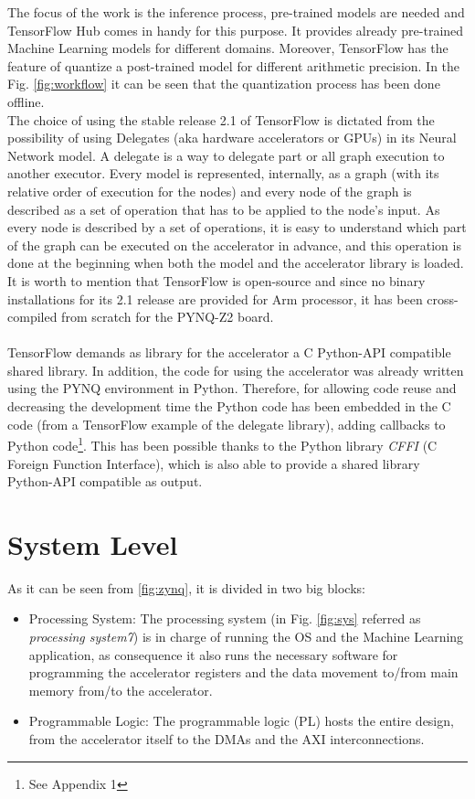 The focus of the work is the inference process, pre-trained models are needed and TensorFlow Hub \cite{WEBSITE:5} comes in handy for this purpose. It provides already pre-trained Machine Learning models for different domains. Moreover, TensorFlow has the feature of quantize a post-trained model for different arithmetic precision. In the Fig. \ref{fig:workflow} it can be seen that the quantization process has been done offline.\\
The choice of using the stable release 2.1 of TensorFlow is dictated from the possibility of using Delegates (aka hardware accelerators or GPUs) in its Neural Network model. A delegate is a way to delegate part or all graph execution to another executor. Every model is represented, internally, as a graph (with its relative order of execution for the nodes) and every node of the graph is described as a set of operation that has to be applied to the node's input. As every node is described by a set of operations, it is easy to understand which part of the graph can be executed on the accelerator in advance, and this operation is done at the beginning when both the model and the accelerator library is loaded. It is worth to mention that TensorFlow is open-source and since no binary installations for its 2.1 release are provided for Arm processor, it has been cross-compiled from scratch for the PYNQ-Z2 board. \\\\

TensorFlow demands as library for the accelerator a C Python-API compatible shared library. In addition, the code for using the accelerator was already written using the PYNQ environment in Python. Therefore, for allowing code reuse and decreasing the development time the Python code has been embedded in the C code (from a TensorFlow example of the delegate library), adding callbacks to Python code\footnote{See Appendix 1}. This has been possible thanks to the Python library \textit{CFFI} (C Foreign Function Interface)\cite{WEBSITE:14}, which is also able to provide a shared library Python-API compatible as output.


\newpage
\section{System Level}

As it can be seen from \ref{fig:zynq}, it is divided in two big blocks:
\begin{itemize}
\item Processing System:
The processing system (in Fig. \ref{fig:sys} referred as \textit{processing system7}) is in charge of running the OS and the Machine Learning application, as consequence it also runs the necessary software for programming the accelerator registers and the data movement to/from main memory from/to the accelerator.
\item Programmable Logic:
The programmable logic (PL) hosts the entire design, from the accelerator itself to the DMAs and the AXI interconnections.
\end{itemize}

